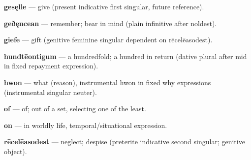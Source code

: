 \textbf{gesęlle} — give (present indicative first singular, future reference).

\textbf{geðęncean} — remember; bear in mind (plain infinitive after noldest).

\textbf{giefe} — gift (genitive feminine singular dependent on rēcelēasodest).

\textbf{hundtēontigum} — a hundredfold; a hundred in return (dative plural after mid in fixed repayment expression).

\textbf{hwon} — what (reason), instrumental hwon in fixed why expressions (instrumental singular neuter).

\textbf{of} — of; out of a set, selecting one of the least.

\textbf{on} — in worldly life, temporal/\allowbreak{}situational expression.

\textbf{rēcelēasodest} — neglect; despise (preterite indicative second singular; genitive object).

